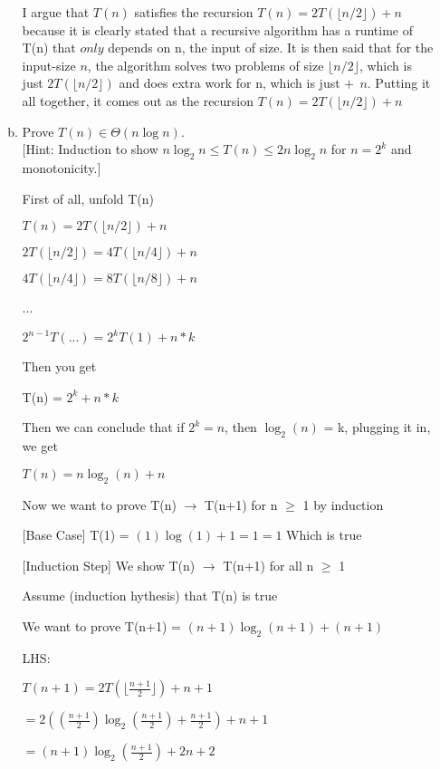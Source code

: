 \documentclass[11pt]{article}
\def\imp{\rightarrow}
\begin{document}
\begin{itemize}
\begin{enumerate}[(a)]
\vspace*{.1in}

I argue that $T(n)$ satisfies the recursion $T(n) = 2T(\lfloor n/2 \rfloor) + n$ because it is clearly stated
that a recursive algorithm has a runtime of T(n) that $only$ depends on n, the input of size. It is then said
that for the input-size $n$, the algorithm solves two problems of size $\lfloor n/2 \rfloor$, which is just $2T(\lfloor n/2 \rfloor)$
and does extra work for n, which is just $ + \: \: n$. Putting it all together, it comes out as the recursion
$T(n) = 2T(\lfloor n/2 \rfloor) + n$

\item Prove $T(n)\in\Theta(n\log n)$.\\
$[$Hint: Induction to show $n\log_2 n\le T(n)\le2n\log_2 n$ for $n=2^k$ and monotonicity.$]$

\vspace*{0.1in}

First of all, unfold T(n)

$T(n) = 2T(\lfloor n/2 \rfloor) + n$

$2T(\lfloor n/2 \rfloor) = 4T(\lfloor n/4 \rfloor) + n$

$4T(\lfloor n/4 \rfloor) = 8T(\lfloor n/8 \rfloor) + n$

...

$2^{n-1}T(...) = 2^kT(1)+ n * k$

Then you get

\vspace*{0.1in}

T(n) = $2^k + n * k$

Then we can conclude that if $2^k = n$, then $\log_2(n)$ = k, plugging it in, we get

$T(n) = n\log_2(n) + n$

Now we want to prove T(n) $\imp$ T(n+1) for n $\geq$ 1 by induction

[Base Case] T(1) = $(1)\log(1) + 1 = 1 = 1$ Which is true

[Induction Step] We show T(n) $\imp$ T(n+1) for all n $\geq$ 1 

Assume (induction hythesis) that T(n) is true

We want to prove T(n+1) = $(n+1)\log_2(n+1) + (n + 1)$

LHS:

$T(n+1) = 2T(\lfloor \frac{n+1}{2} \rfloor) + n + 1$

$= 2((\frac{n+1}{2})\log_2(\frac{n+1}{2})+ \frac{n+1}{2})+n+1$

$= (n+1)\log_2(\frac{n+1}{2}) + 2n + 2$


\end{enumerate}
\end{itemize}
\end{document}
